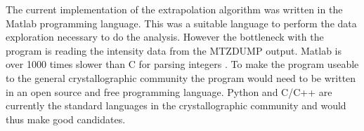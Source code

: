 The current implementation of the extrapolation algorithm was written in the Matlab programming language.
This was a suitable language to perform the data exploration necessary to do the analysis.
However the bottleneck with the program is reading the intensity data from the MTZDUMP output.
Matlab is over 1000 times slower than C for parsing integers \cite{bezanson2014julia}.
To make the program useable to the general crystallographic community the program would need to be written in an open source and free programming language.
Python and C/C++ are currently the standard languages in the crystallographic community and would thus make good candidates.
